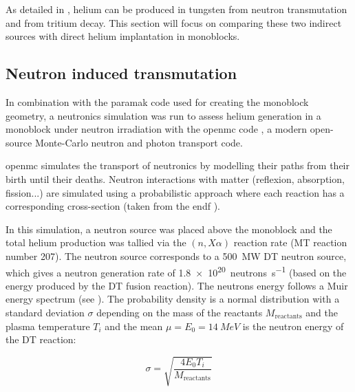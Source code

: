 As detailed in , helium can be produced in tungsten from neutron \gls{transmutation} and from tritium decay.
This section will focus on comparing these two indirect sources with direct helium implantation in \glspl{monoblock}.

\subsection{Neutron induced transmutation}

In combination with the \gls{paramak} code  used for creating the \gls{monoblock} geometry, a neutronics simulation was run to assess helium generation in a \gls{monoblock} under neutron irradiation with the \gls{openmc} code , a modern open-source Monte-Carlo neutron and photon transport code.

\Gls{openmc} simulates the transport of neutronics by modelling their paths from their birth until their deaths.
Neutron interactions with matter (reflexion, absorption, fission...) are simulated using a probabilistic approach where each reaction has a corresponding cross-section (taken from the \gls{endf} ).

In this simulation, a neutron source was placed above the \gls{monoblock} and the total helium production was tallied via the $(n,X\alpha)$ reaction rate (MT reaction number 207).
The neutron source corresponds to a \SI{500}{MW} DT neutron source, which gives a neutron generation rate of \SI{1.8e20}{neutrons.s^{-1}} (based on the energy produced by the DT fusion reaction).
The neutrons energy follows a Muir energy spectrum  (see ).
The probability density is a normal distribution with a standard deviation $\sigma$ depending on the mass of the reactants $M_\mathrm{reactants}$ and the \gls{plasma} temperature $T_i$ and the mean $\mu=E_0= \SI{14}{MeV}$ is the neutron energy of the DT reaction:

\begin{equation}
    \sigma = \sqrt{\frac{4 E_0 T_i}{M_\mathrm{reactants}}}
\end{equation}

